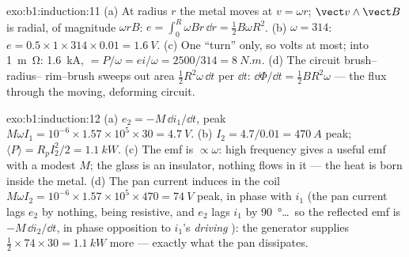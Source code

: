 \begin{solution}{exo:b1:induction:11}
(a) At radius $r$ the metal moves at $v = \omega r$; $\vect v\wedge\vect B$ is
radial, of magnitude $\omega rB$: $e = \int_0^R\omega Br\,\dd r = \tfrac12B\omega R^2$.
(b) $\omega = 314$: $e = 0.5 \times 1 \times 314 \times 0.01 = \qty{1.6}{V}$. (c) One
``turn'' only, so volts at most; into \qty{1}{m\ohm}: \qty{1.6}{kA}, 
$= P/\omega = ei/\omega = 2500/314 = \qty{8}{N.m}$. (d) The circuit brush--radius--
rim--brush sweeps out area $\tfrac12R^2\omega\,\dd t$ per $\dd t$: $\dd\Phi/\dd t =
\tfrac12BR^2\omega$ --- the flux through the moving, deforming circuit.
\end{solution}

\begin{solution}{exo:b1:induction:12}
(a) $e_2 = -M\,\dd i_1/\dd t$, peak $M\omega I_1 = 10^{-6} \times 1.57 \times 10^5 \times 30 =
\qty{4.7}{V}$. (b) $I_2 = 4.7/0.01 = \qty{470}{A}$ peak; $\langle P\rangle = R_pI_2^2/2
= \qty{1.1}{kW}$. (c) The emf is $\propto\omega$: high frequency gives a useful
emf with a modest $M$; the glass is an insulator, nothing flows in it
--- the heat is born inside the metal. (d) The pan current induces in
the coil $M\omega I_2 = 10^{-6} \times 1.57 \times 10^5 \times 470 = \qty{74}{V}$ peak,
in phase with $i_1$ (the pan current lags $e_2$ by nothing, being
resistive, and $e_2$ lags $i_1$ by \qty{90}{\degree}\ldots\ so the
reflected emf is $-M\,\dd i_2/\dd t$, in phase opposition to $i_1$'s
\emph{driving} ): the generator supplies $\tfrac12 \times 74 \times 30 =
\qty{1.1}{kW}$ more --- exactly what the pan dissipates.
\end{solution}

